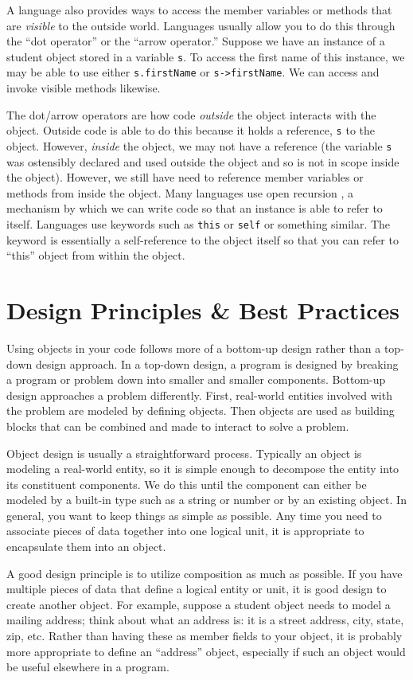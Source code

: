 A language also provides ways to access the member variables or
methods that are \emph{visible} to the outside world.  Languages usually
allow you to do this through the ``dot operator'' or the ``arrow operator.''
Suppose we have an instance of a student object stored in a variable
\texttt{s}.  To access the first name of this instance, we may
be able to use either \texttt{s.firstName} or 
\texttt{s->firstName}.  We can access and invoke visible methods 
likewise.  

The dot/arrow operators are how code \emph{outside} the object interacts
with the object.  Outside code is able to do this because it holds a 
reference, \texttt{s} to the object.  However, \emph{inside} the
object, we may not have a reference (the variable \texttt{s} was
ostensibly declared and used outside the object and so is not in
scope inside the object).  However, we still have need to reference
member variables or methods from inside the object.  Many languages
use \gls{open recursion} , a mechanism by which
we can write code so that an instance is able to refer to itself.
Languages use keywords such as \texttt{this} or \texttt{self}
or something similar.  The keyword is essentially a self-reference to
the object itself so that you can refer to ``this'' object from within
the object.

\section{Design Principles \& Best Practices}

Using objects in your code follows more of a 
bottom-up design rather than
a top-down design approach.  In a top-down design, a program is designed
by breaking a program or problem down into smaller and smaller components.
Bottom-up design approaches a problem differently.  First, real-world
entities involved with the problem are modeled by defining objects.  
Then objects are used as building blocks that can be combined and made
to interact to solve a problem.

Object design is usually a straightforward process.  Typically an object
is modeling a real-world entity, so it is simple enough to decompose the
entity into its constituent components.  We do this until the component
can either be modeled by a built-in type such as a string or number or
by an existing object.  In general, you want to keep things as simple
as possible.  Any time you need to associate pieces of data together into
one logical unit, it is appropriate to encapsulate them
into an object.

A good design principle is to utilize composition as much as possible.
If you have multiple pieces of data that define a logical entity or 
unit, it is good design to create another object.  For example, suppose a
student object needs to model a mailing address; think about what an
address is: it is a street address, city, state, zip, etc.  Rather
than having these as member fields to your object, it is probably
more appropriate to define an ``address'' object, especially if such
an object would be useful elsewhere in a program.

